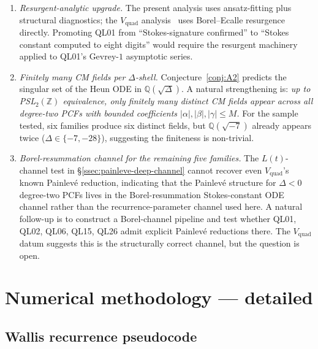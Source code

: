 \documentclass[11pt,reqno]{amsart}
\theoremstyle{definition}
\begin{document}
\begin{enumerate}[label={\bfseries(O\arabic*)}]
\item \emph{Resurgent-analytic upgrade.} The present
analysis uses ansatz-fitting plus structural diagnostics;
the $V_{\mathrm{quad}}$ analysis~\cite{Papanokechi2026Vquad}
uses Borel--Ecalle resurgence directly. Promoting QL01 from
``Stokes-signature confirmed'' to ``Stokes constant
computed to eight digits'' would require the resurgent
machinery applied to QL01's Gevrey-$1$ asymptotic series.
\label{op:resurgent}

\item \emph{Finitely many CM fields per $\Delta$-shell.}
Conjecture~\ref{conj:A2} predicts the singular set of the
Heun ODE in $\mathbb{Q}(\sqrt{\Delta})$. A natural
strengthening is: \emph{up to PSL$_{2}(\mathbb{Z})$
equivalence, only finitely many distinct CM fields appear
across all degree-two PCFs with bounded coefficients
$|\alpha|,|\beta|,|\gamma|\le M$.} For the sample tested,
six families produce six distinct fields, but
$\mathbb{Q}(\sqrt{-7})$ already appears twice
($\Delta\in\{-7,-28\}$), suggesting the finiteness is
non-trivial.
\label{op:finite-fields}

\item \emph{Borel-resummation channel for the remaining five
families.} The $L(t)$-channel test in
\S\ref{ssec:painleve-deep-channel} cannot recover even
$V_{\mathrm{quad}}$'s known Painlev\'e reduction, indicating
that the Painlev\'e structure for $\Delta<0$ degree-two PCFs
lives in the Borel-resummation Stokes-constant ODE channel
rather than the recurrence-parameter channel used here. A
natural follow-up is to construct a Borel-channel pipeline
and test whether QL01, QL02, QL06, QL15, QL26 admit explicit
Painlev\'e reductions there. The $V_{\mathrm{quad}}$ datum
suggests this is the structurally correct channel, but the
question is open.
\label{op:borel-channel}
\end{enumerate}

\appendix
\section{Numerical methodology --- detailed}\label{app:numerical}

\subsection{Wallis recurrence pseudocode}\label{app:wallis}
\end{document}
